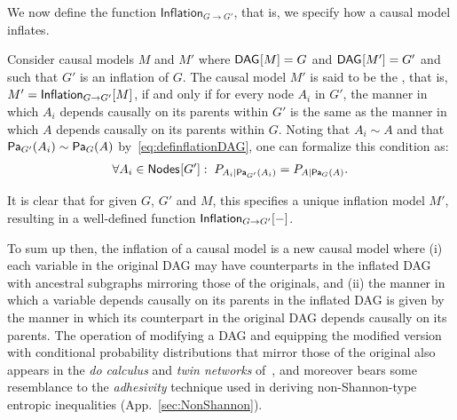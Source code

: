 We now define the function $\mathsf{Inflation}_{G\to G'}$, that is, we specify how a causal model inflates.

\begin{definition}
\label{def:inflat}
Consider causal models $M$ and $M'$ where $\SmallNamedFunction{DAG}{M}=G$ and $\SmallNamedFunction{DAG}{M'}=G'$ and such that $G'$ is an inflation of $G$.   The causal model $M'$ is said to be the {\em {}}, that is, $M' = \SmallNamedFunction[G\to G']{Inflation}{M}$,  if and only if for every node $A_i$ in $G'$, the manner in which $A_i$ depends causally on its parents within $G'$ is the same as the manner in which $A$ depends causally on its parents within $G$.  Noting that $A_i \sim A$ and that $\Pa[G']{A_i} \sim \Pa[G]{A}$ by~\cref{eq:definflationDAG}, one can formalize this condition as:
\begin{align}\label{eq:funcdependences}
 \forall A_i \in \SmallNamedFunction{Nodes}{G'}:\; \pfunc{A_i| \Pa[G']{A_i}}=\pfunc{A|\Pa[G]{A}}.
\end{align}
\end{definition}

It is clear that for given $G$, $G'$ and $M$, this specifies a unique inflation model $M'$, resulting in a well-defined function $\SmallNamedFunction[G\to G']{Inflation}{-}$.

To sum up then, the inflation of a causal model is a new causal model where (i) each variable in the original DAG may have counterparts in the inflated DAG with ancestral subgraphs mirroring those of the originals, and (ii) the manner in which a variable depends causally on its parents in the inflated DAG is given by the manner in which its counterpart in the original DAG depends causally on its parents. The operation of modifying a DAG and equipping the modified version with conditional probability distributions that mirror those of the original also appears in the \emph{do calculus} and \emph{twin networks} of~\citet{pearl2009causality}, and moreover bears some resemblance to the \emph{adhesivity} technique used in deriving non-Shannon-type entropic inequalities (App.~\ref{sec:NonShannon}).


